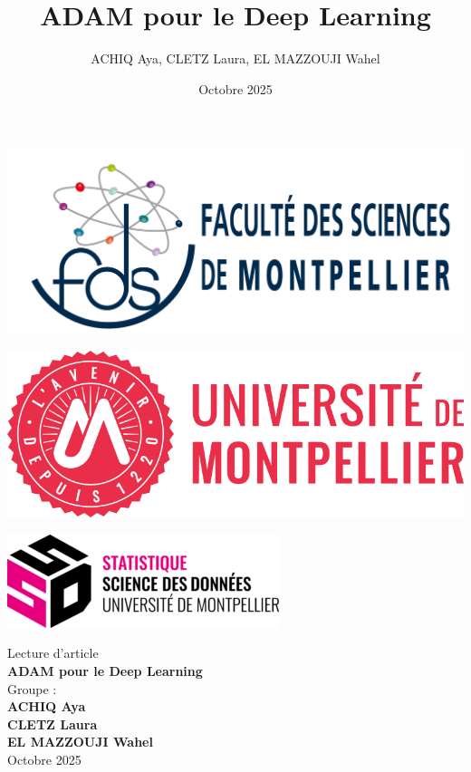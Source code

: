 \documentclass[a4paper,12pt]{article}
\title{ADAM pour le Deep Learning}
\author{ACHIQ Aya, CLETZ Laura, EL MAZZOUJI Wahel}
\date{Octobre 2025}
\begin{document}
\begin{titlepage}
\centering

\begin{minipage}{0.4\textwidth}
    \includegraphics[width=\linewidth]{images/FdS.jpg}
\end{minipage}
\hfill
\begin{minipage}{0.4\textwidth}
    \includegraphics[width=\linewidth]{images/UM.png}
\end{minipage}

\vspace{1cm}

\begin{minipage}{0.4\textwidth}
    \centering
    \includegraphics[width=\linewidth]{images/SSD.png}
\end{minipage}

\vspace{2cm}

{\Large Lecture d'article}\\[0.4cm]
{\LARGE \textbf{ADAM pour le Deep Learning}}\\[1.2cm]

{\large Groupe :}\\[0.3cm]
\textbf{ACHIQ Aya}\\
\textbf{CLETZ Laura}\\
\textbf{EL MAZZOUJI Wahel}\\[1.5cm]

{\large Octobre 2025}

\vfill
\end{titlepage}
\end{document}
